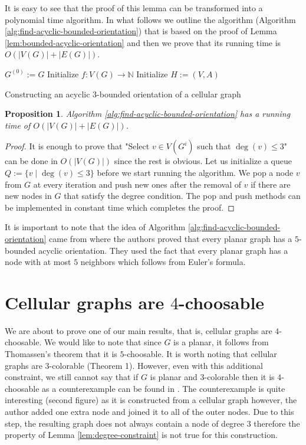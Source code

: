 \documentclass[letterpaper, 10 pt, conference]{ieeeconf}  %
\newtheorem{prop}{Proposition}
\begin{document}
It is easy to see that the proof of this lemma can be transformed into a polynomial time algorithm. In what follows we outline the algorithm (Algorithm \ref{alg:find-acyclic-bounded-orientation}) that is based on the proof of Lemma \ref{lem:bounded-acyclic-orientation} and then we prove that its running time is $O(|V(G)| + |E(G)|)$.
\begin{algorithm}\label{alg:find-acyclic-bounded-orientation}
 $G^{(0)} := G$\;
 Initialize $f \colon V(G) \to \mathbb{N}$\;
 Initialize $H:=(V,A)$\;
 \caption{Constructing an acyclic $3$-bounded orientation of a cellular graph}
\end{algorithm}
\begin{prop} Algorithm \ref{alg:find-acyclic-bounded-orientation} has a running time of $O(|V(G)| + |E(G)|)$.
\end{prop}
\begin{proof}
It is enough to prove that "Select $v \in V(G^i)$ such that $\deg(v) \leqslant 3$" can be done in $O(|V(G)|)$ since the rest is obvious. Let us initialize a queue $Q := \lbrace v \mid \deg(v) \leqslant  3\rbrace$ before we start running the algorithm. We pop a node $v$ from $G$ at every iteration and push new ones after the removal of $v$ if there are new nodes in $G$ that satisfy the degree condition. The pop and push methods can be implemented in constant time which completes the proof.
\end{proof}

It is important to note that the idea of Algorithm \ref{alg:find-acyclic-bounded-orientation} came from \cite{CHROBAK1991243} where the authors proved that every planar graph has a $5$-bounded acyclic orientation. They used the fact that every planar graph has a node with at most $5$ neighbors which follows from Euler's formula.
\section{Cellular graphs are $4$-choosable}

We are about to prove one of our main results, that is, cellular graphs are $4$-choosable. We would like to note that since $G$ is a planar, it follows from Thomassen's theorem \cite{Thomassen:1994:PG:184180.184192} that it is $5$-choosable. It is worth noting that cellular graphs are $3$-colorable \cite{662943} (Theorem 1). However, even with this additional constraint, we still cannot say that if $G$ is planar and $3$-colorable then it is $4$-choosable as a counterexample can be found in \cite{JGT:JGT4}. The counterexample is quite interesting (second figure) as it is constructed from a cellular graph however, the author added one extra node and joined it to all of the outer nodes. Due to this step, the resulting graph does not always contain a node of degree $3$ therefore the property of Lemma \ref{lem:degree-constraint} is not true for this construction.
\end{document}
